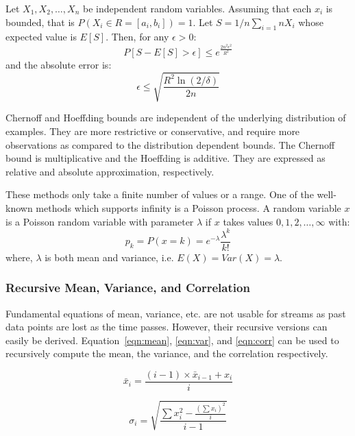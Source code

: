\begin{theorem}
\label{thm:hoeffding}
    Let $X_1,X_2,\dots, X_n$ be independent random variables. Assuming that each $x_i$ is bounded, that is $P(X_i \in R = [a_i, b_i]) = 1$. Let $S = 1/n \sum_{i=1}{n} X_i$ whose expected value is $E[S]$. Then, for any $\epsilon > 0$:
    \[
        P[S - E[S] > \epsilon] \le e^{ \frac{2 n^2 \epsilon^2}{R^2} }
    \]
    and the absolute error is:
    \[
        \epsilon \le \sqrt{\frac{R^2 \ln(2/\delta)}{2n}}
    \]
\end{theorem}

Chernoff and Hoeffding bounds are independent of the underlying distribution of examples. They are more restrictive or conservative, and require more observations as compared to the distribution dependent bounds. The Chernoff bound is multiplicative and the Hoeffding is additive. They are expressed as relative and absolute approximation, respectively.

These methods only take a finite number of values or a range. One of the well-known methods which supports infinity is a Poisson process. A random variable $x$ is a Poisson random variable with parameter $\lambda$ if $x$ takes values $0,1,2, \dots, \infty$ with:
    \begin{equation}
    \label{eqn:poisson}
        p_k = P(x=k) = e^{-\lambda} \frac{\lambda^k}{k!}
    \end{equation}
where, $\lambda$ is both mean and variance, i.e. $E(X) = Var(X) = \lambda$.
    
\subsubsection{Recursive Mean, Variance, and Correlation}
Fundamental equations of mean, variance, etc. are not usable for streams as past data points are lost as the time passes. However, their recursive versions can easily be derived. Equation~\ref{eqn:mean}, \ref{eqn:var}, and \ref{eqn:corr} can be used to recursively compute the mean, the variance, and the correlation respectively.

\begin{equation}
\label{eqn:mean}
    \bar{x}_i = \frac{(i-1) \times \bar{x}_{i-1} + x_i}{i}
\end{equation}

\begin{equation}
\label{eqn:var}
    \sigma_i = \sqrt{ \frac{\sum x_i^2 - \frac{ (\sum x_i )^2}{i} }{i-1} }
\end{equation}


